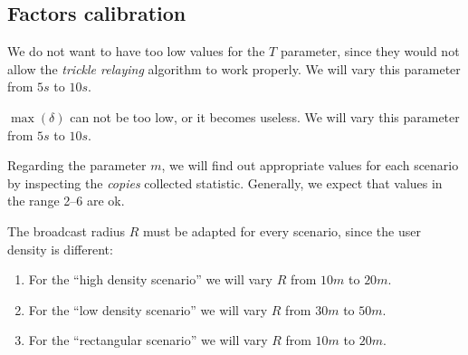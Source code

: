 \subsection{Factors calibration}\label{subsec:calibration}

We do not want to have too low values for the \(T\) parameter, since they would
not allow the \emph{trickle relaying} algorithm to work properly. We will vary
this parameter from \(5s\) to \(10s\).

\(\max(\delta)\) can not be too low, or it becomes useless. We will vary this
parameter from \(5s\) to \(10s\).

Regarding the parameter \(m\), we will find out appropriate values for each
scenario by inspecting the \textit{copies} collected statistic. Generally, we
expect that values in the range 2--6 are ok.

The broadcast radius \(R\) must be adapted for every scenario, since the user
density is different:
\begin{enumerate}
	\item For the ``high density scenario'' we will vary \(R\) from \(10m\)
		to \(20m\).
	\item For the ``low density scenario'' we will vary \(R\) from \(30m\)
		to \(50m\).
	\item For the ``rectangular scenario'' we will vary \(R\) from \(10m\)
		to \(20m\).
\end{enumerate}
